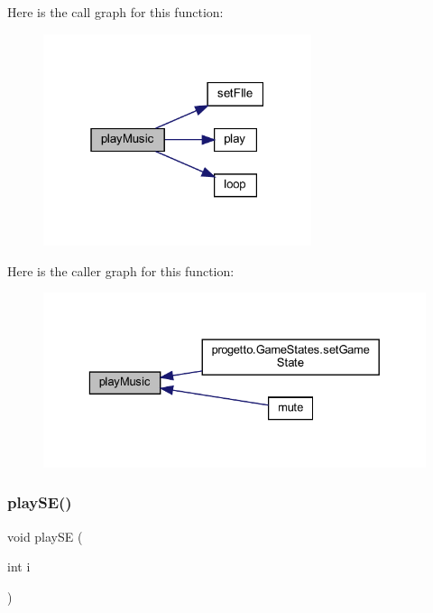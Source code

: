 Here is the call graph for this function\+:\nopagebreak
\begin{figure}[H]
\begin{center}
\leavevmode
\includegraphics[width=223pt]{classprogetto_1_1_sound_afbebd3583bea93ca3867632861ec5801_cgraph}
\end{center}
\end{figure}
Here is the caller graph for this function\+:\nopagebreak
\begin{figure}[H]
\begin{center}
\leavevmode
\includegraphics[width=329pt]{classprogetto_1_1_sound_afbebd3583bea93ca3867632861ec5801_icgraph}
\end{center}
\end{figure}
\mbox{\label{classprogetto_1_1_sound_a98228f023eb842c07bae8aa04a26db94}} 
\subsubsection{\texorpdfstring{play\+S\+E()}{playSE()}}
{\footnotesize\ttfamily void play\+SE (\begin{DoxyParamCaption}\item[{int}]{i }\end{DoxyParamCaption})}



